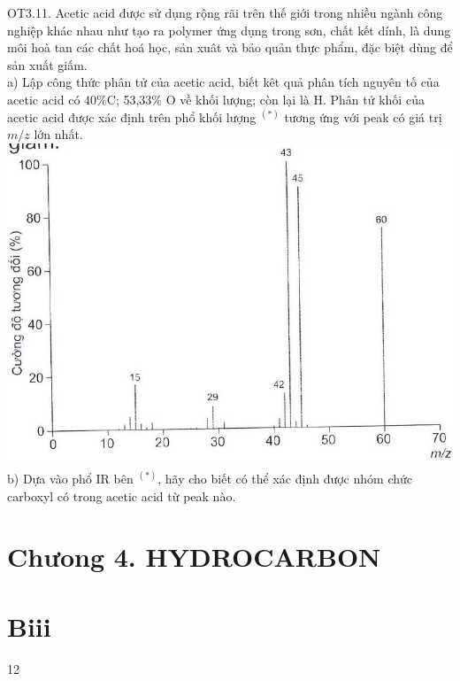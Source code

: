 \documentclass[10pt]{article}
\begin{document}
OT3.11. Acetic acid được sử dụng rộng rãi trên thế giới trong nhiều ngành công nghiệp khác nhau như tạo ra polymer ứng dụng trong sơn, chất kết dính, là dung môi hoà tan các chất hoá học, sản xuât và bảo quản thực phẩm, đặc biệt dùng để sản xuất giấm.\\
a) Lập công thức phân tử của acetic acid, biết kêt quả phân tích nguyên tố của acetic acid có $40 \% \mathrm{C}$; 53,33\% O về khối lượng; còn lại là H. Phân tử khối của acetic acid được xác định trên phổ khối lượng ${ }^{(*)}$ tương ứng với peak có giá trị $m / z$ lớn nhất.\\
\includegraphics[max width=\textwidth, center]{2025_10_23_ae7aef68fb3b41082d29g-23}\\
b) Dựa vào phổ IR bên ${ }^{(*)}$, hãy cho biết có thể xác định được nhóm chức carboxyl có trong acetic acid từ peak nào.

\section*{Chưong 4. HYDROCARBON}
\section*{Biii}
12
\end{document}
